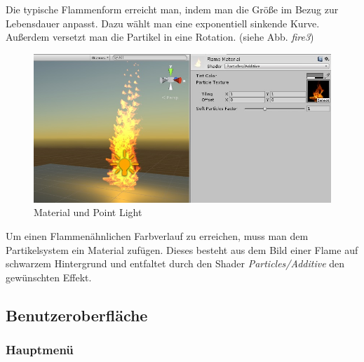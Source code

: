 Die typische Flammenform erreicht man, indem man die Größe im Bezug zur Lebensdauer anpasst. Dazu wählt man eine exponentiell sinkende Kurve. Außerdem versetzt man die Partikel in eine Rotation. (siehe Abb. \textit{fire3})

\begin{figure}[h!]
\centering
\includegraphics[width=0.95\linewidth]{Abbildungen/Unity/Fire/fire4}
\caption{Material und Point Light}
\label{fig:fire4}
\end{figure}

Um einen Flammenähnlichen Farbverlauf zu erreichen, muss man dem Partikelsystem ein Material zufügen. Dieses besteht aus dem Bild einer Flame auf schwarzem Hintergrund und entfaltet durch den Shader \textit{Particles/Additive} den gewünschten Effekt.

\newpage

\subsection{Benutzeroberfläche}
\subsubsection{Hauptmenü}
\subsubsection{}






 

